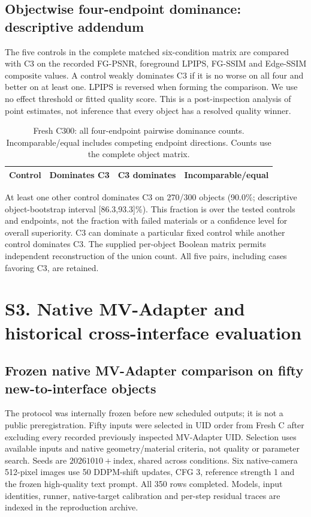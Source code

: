 \documentclass[11pt]{article}
\begin{document}
\clearpage

\FloatBarrier
\subsection*{Objectwise four-endpoint dominance: descriptive addendum}
The five controls in the complete matched six-condition matrix are compared with C3 on the recorded FG-PSNR, foreground LPIPS, FG-SSIM and Edge-SSIM composite values. A control weakly dominates C3 if it is no worse on all four and better on at least one. LPIPS is reversed when forming the comparison. We use no effect threshold or fitted quality score. This is a post-inspection analysis of point estimates, not inference that every object has a resolved quality winner.

\begin{table}[ht]\centering\small
\caption{Fresh C300: all four-endpoint pairwise dominance counts. Incomparable/equal includes competing endpoint directions. Counts use the complete object matrix.}\label{tab:dominance015}
\begin{tabular}{lrrr}\toprule Control & Dominates C3 & C3 dominates & Incomparable/equal \\
\midrule\bottomrule\end{tabular}
\end{table}
At least one other control dominates C3 on 270/300 objects (90.0\%; descriptive object-bootstrap interval [86.3,93.3]\%). This fraction is over the tested controls and endpoints, not the fraction with failed materials or a confidence level for overall superiority. C3 can dominate a particular fixed control while another control dominates C3. The supplied per-object Boolean matrix permits independent reconstruction of the union count. All five pairs, including cases favoring C3, are retained.

\FloatBarrier
\section*{S3. Native MV-Adapter and historical cross-interface evaluation}
\label{supp:group3}

\subsection*{Frozen native MV-Adapter comparison on fifty new-to-interface objects}
The protocol was internally frozen before new scheduled outputs; it is not a public preregistration. Fifty inputs were selected in UID order from Fresh C after excluding every recorded previously inspected MV-Adapter UID. Selection uses available inputs and native geometry/material criteria, not quality or parameter search. Seeds are $20261010+\mathrm{index}$, shared across conditions. Six native-camera 512-pixel images use 50 DDPM-shift updates, CFG 3, reference strength 1 and the frozen high-quality text prompt. All 350 rows completed. Models, input identities, runner, native-target calibration and per-step residual traces are indexed in the reproduction archive.
\end{document}
